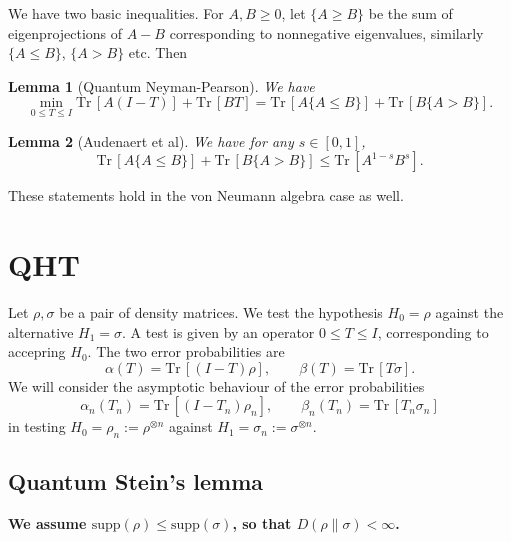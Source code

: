 \documentclass[12pt]{article}
\newtheorem{lemma}{Lemma}
\theoremstyle{definition}
\theoremstyle{remark}
\def \Tr{\mathrm{Tr}\,}
\def\supp{\mathrm{supp}}
\begin{document}
We have two basic inequalities. For $A,B\ge 0$, let  $\{A\ge B\}$ be the sum of
eigenprojections of $A-B$ corresponding to nonnegative eigenvalues, similarly $\{A\le
B\}$, $\{A>B\}$ etc. Then 
\begin{lemma}[Quantum Neyman-Pearson]\label{lemma:qnp} We have 
\[
\min_{0\le T\le I} \Tr[A(I-T)]+\Tr[BT]=\Tr[A\{A\le B\}]+\Tr[B\{A>B\}].
\]

\end{lemma}

\begin{lemma}[Audenaert et al]\label{lemma:audenaert} We have for any $s\in [0,1]$, 
\[
\Tr[A\{A\le B\}]+\Tr[B\{A>B\}]\le \Tr[A^{1-s}B^s].
\]

\end{lemma}

These statements hold in the von Neumann algebra case as well.

\section{QHT}


Let $\rho,\sigma$ be a pair of density matrices. We test the hypothesis $H_0=\rho$ against
the alternative $H_1=\sigma$. A test is given by an operator $0\le T\le I$, corresponding
to accepring $H_0$. The two error probabilities are
\[
\alpha(T)=\Tr[(I-T)\rho],\qquad \beta(T)=\Tr[T\sigma].
\]
We will consider the asymptotic behaviour of the error probabilities 
\[
\alpha_n(T_n)=\Tr[(I-T_n)\rho_n],\qquad \beta_n(T_n)=\Tr[T_n\sigma_n]
\]
in testing $H_0=\rho_n:=\rho^{\otimes n}$ against $H_1=\sigma_n:=\sigma^{\otimes n}$. 

\subsection{Quantum Stein's lemma}


\textbf{We assume $\supp(\rho)\le \supp(\sigma)$, so that $D(\rho\|\sigma)<\infty$.}

\bigskip
\end{document}
